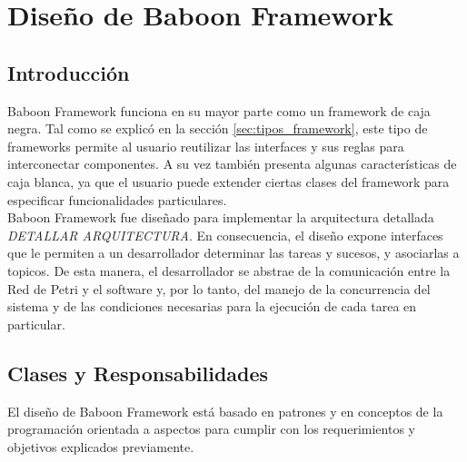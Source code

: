 \section{Diseño de Baboon Framework}

\subsection{Introducción}
Baboon Framework funciona en su mayor parte como un framework de caja negra.
Tal como se explicó en la sección \autoref{sec:tipos_framework}, este tipo de
frameworks permite al usuario reutilizar las interfaces y sus reglas para
interconectar componentes.
A su vez también presenta algunas características de caja blanca,
ya que el usuario puede extender ciertas clases del framework para especificar
funcionalidades particulares.\\
Baboon Framework fue diseñado para implementar la arquitectura detallada
\emph{\color{red} DETALLAR ARQUITECTURA}.
En consecuencia, el diseño expone interfaces que le permiten a un desarrollador
determinar las tareas y sucesos, y asociarlas a topicos. De esta manera, el desarrollador
se abstrae de la comunicación entre la Red de Petri y el software y, por lo
tanto, del manejo de la concurrencia del sistema y de las condiciones
necesarias para la ejecución de cada tarea en particular.

\subsection{Clases y Responsabilidades}
El diseño de Baboon Framework está basado en patrones y en conceptos de la
programación orientada a aspectos para cumplir con los requerimientos y
objetivos explicados previamente.


